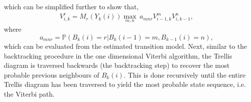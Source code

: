 \documentclass[10pt,twocolumn]{IEEEtran}
\newcommand{\bk}[1]{{\color{red}{[BK: #1]}}}
\begin{document}
which can be simplified further to show that,
\begin{equation}\label{34}
    \begin{aligned}
        V_{i,k}^{r} = M_r(Y_k(i))\max_{m,n}\ a_{mnr}V_{i-1,k}^{m}V_{i,k-1}^{n},
    \end{aligned}
\end{equation}
where
\begin{equation}\label{35}
    a_{mnr} = \mathbb{P}(B_k(i)=r|B_{k}(i-1)=m,B_{k-1}(i)=n),
\end{equation}
which can be evaluated from the estimated transition model. Next, similar to the backtracking procedure in the one dimensional Viterbi algorithm, the Trellis diagram is traversed backwards (the backtracking step) to recover the most probable previous neighbours of $B_k(i)$. This is done recursively until the entire Trellis diagram has been traversed to yield the most probable state sequence, i.e. the Viterbi path.
\\\bk{Add the algorithm block which will include the equation for backtracking}
\end{document}
